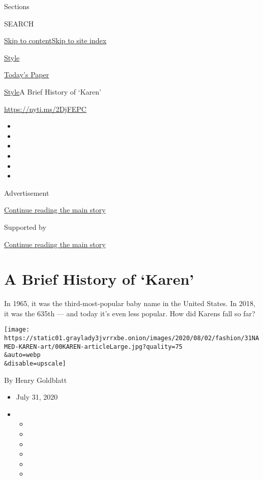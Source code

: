 Sections

SEARCH

\protect\hyperlink{site-content}{Skip to
content}\protect\hyperlink{site-index}{Skip to site index}

\href{https://www.nytimes3xbfgragh.onion/section/style}{Style}

\href{https://myaccount.nytimes3xbfgragh.onion/auth/login?response_type=cookie\&client_id=vi}{}

\href{https://www.nytimes3xbfgragh.onion/section/todayspaper}{Today's
Paper}

\href{/section/style}{Style}\textbar{}A Brief History of `Karen'

\url{https://nyti.ms/2DjFEPC}

\begin{itemize}
\item
\item
\item
\item
\item
\item
\end{itemize}

Advertisement

\protect\hyperlink{after-top}{Continue reading the main story}

Supported by

\protect\hyperlink{after-sponsor}{Continue reading the main story}

\hypertarget{a-brief-history-of-karen}{%
\section{A Brief History of `Karen'}\label{a-brief-history-of-karen}}

In 1965, it was the third-most-popular baby name in the United States.
In 2018, it was the 635th --- and today it's even less popular. How did
Karens fall so far?

\texttt{[image: https://static01.graylady3jvrrxbe.onion/images/2020/08/02/fashion/31NAMED-KAREN-art/00KAREN-articleLarge.jpg?quality=75\\\&auto=webp\\\&disable=upscale]}

By Henry Goldblatt

\begin{itemize}
\item
  July 31, 2020
\item
  \begin{itemize}
  \item
  \item
  \item
  \item
  \item
  \item
  \end{itemize}
\end{itemize}

